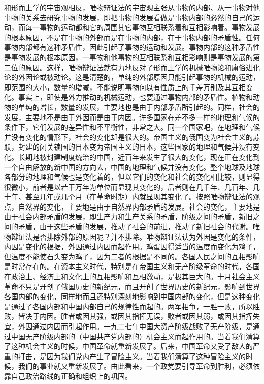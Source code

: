 和形而上学的宇宙观相反，唯物辩证法的宇宙观主张从事物的内部、从一事物对他事物的关系去研究事物的发展，即把事物的发展看做是事物内部的必然的自己的运动，而每一事物的运动都和它的周围其它事物互相联系着和互相影响着。事物发展的根本原因，不是在事物的外部而是在事物的内部，在于事物内部的矛盾性。任何事物内部都有这种矛盾性，因此引起了事物的运动和发展。事物内部的这种矛盾性是事物发展的根本原因，一事物和他事物的互相联系和互相影响则是事物发展的第二位的原因。这样，唯物辩证法就有力地反对了形而上学的机械唯物论和庸俗进化论的外因论或被动论。这是清楚的，单纯的外部原因只能引起事物的机械的运动，即范围的大小，数量的增减，不能说明事物何以有性质上的千差万别及其互相变化。事实上，即使是外力推动的机械运动，也要通过事物内部的矛盾性。植物和动物的单纯的增长，数量的发展，主要地也是由于内部矛盾所引起的。同样，社会的发展，主要地不是由于外因而是由于内因。许多国家在差不多一样的地理和气候的条件下，它们发展的差异性和不平衡性，非常之大。同一个国家吧，在地理和气候并没有变化的情形下，社会的变化却是很大的。帝国主义的俄国变为社会主义的苏联，封建的闭关锁国的日本变为帝国主义的日本，这些国家的地理和气候并没有变化。长期地被封建制度统治的中国，近百年来发生了很大的变化，现在正在变化到一个自由解放的新中国的方向去，中国的地理和气候并没有变化。整个地球及地球各部分的地理和气候也是变化着的，但以它们的变化和社会的变化相比较，则显得很微小，前者是以若干万年为单位而显现其变化的，后者则在几千年、几百年、几十年、甚至几年或几个月（在革命时期）内就显现其变化了。按照唯物辩证法的观点，自然界的变化，主要地是由于自然界内部矛盾的发展。社会的变化，主要地是由于社会内部矛盾的发展，即生产力和生产关系的矛盾，阶级之间的矛盾，新旧之间的矛盾，由于这些矛盾的发展，推动了社会的前进，推动了新旧社会的代谢。唯物辩证法是否排除外部的原因呢？并不排除。唯物辩证法认为外因是变化的条件，内因是变化的根据，外因通过内因而起作用。鸡蛋因得适当的温度而变化为鸡子，但温度不能使石头变为鸡子，因为二者的根据是不同的。各国人民之间的互相影响是时常存在的。在资本主义时代，特别是在帝国主义和无产阶级革命的时代，各国在政治上、经济上和文化上的互相影响和互相激动，是极其巨大的。十月社会主义革命不只是开创了俄国历史的新纪元，而且开创了世界历史的新纪元，影响到世界各国内部的变化，同样地而且还特别深刻地影响到中国内部的变化，但是这种变化是通过了各国内部和中国内部自己的规律性而起的。两军相争，一胜一败，所以胜败，皆决于内因。胜者或因其强，或因其指挥无误，败者或因其弱，或因其指挥失宜，外因通过内因而引起作用。一九二七年中国大资产阶级战败了无产阶级，是通过中国无产阶级内部的（中国共产党内部的）机会主义而起作用的。当着我们清算了这种机会主义的时候，中国革命就重新发展了。后来，中国革命又受了敌人的严重的打击，是因为我们党内产生了冒险主义。当着我们清算了这种冒险主义的时候，我们的事业就又重新发展了。由此看来，一个政党要引导革命到胜利，必须依靠自己政治路线的正确和组织上的巩固。

